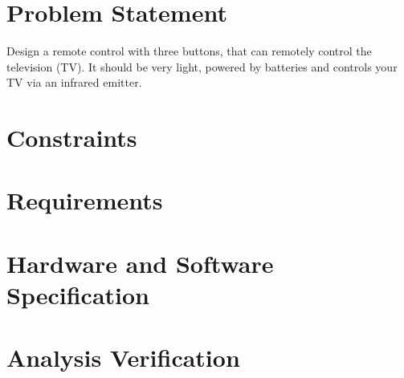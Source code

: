 \documentclass[12pt, letterpaper]{report}
\begin{document}
\section{Problem Statement}
Design a remote control with three buttons, that can remotely control the television (TV). It should be very light, powered by batteries and controls your TV via an infrared emitter.


\section{Constraints}

\section{Requirements}

\section{Hardware and Software Specification}

\section{Analysis Verification}
\end{document}
